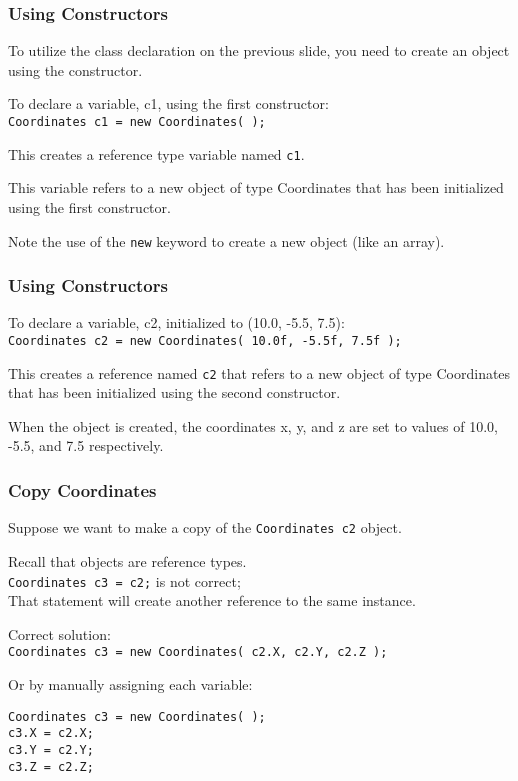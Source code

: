 \begin{frame}
\frametitle{Using Constructors}

To utilize the class declaration on the previous slide, you need to create an object using the constructor.

To declare a variable, c1, using the first constructor:\\
\quad \texttt{Coordinates c1 = new Coordinates( );}

This creates a reference type variable named \texttt{c1}.

This variable refers to a new object of type Coordinates that has been initialized using the first constructor.

Note the use of the \texttt{new} keyword to create a new object (like an array).

\end{frame}

\begin{frame}
\frametitle{Using Constructors}
To declare a variable, c2, initialized to (10.0, -5.5, 7.5):\\
\texttt{Coordinates c2 = new Coordinates( 10.0f, -5.5f, 7.5f );}

This creates a reference named \texttt{c2} that refers to a new object of type Coordinates that has been initialized using the second constructor.

When the object is created, the coordinates x, y, and z are set to values of 10.0, -5.5, and 7.5 respectively.

\end{frame}

\begin{frame}[fragile]
\frametitle{Copy Coordinates}
Suppose we want to make a copy of the \texttt{Coordinates c2} object.

Recall that objects are reference types. \\
\quad \texttt{Coordinates c3 = c2;} is not correct; \\
\quad That statement will create another reference to the same instance.

Correct solution:\\
\quad \texttt{Coordinates c3 = new Coordinates( c2.X, c2.Y, c2.Z );}


Or by manually assigning each variable:
\begin{verbatim}
Coordinates c3 = new Coordinates( );
c3.X = c2.X;
c3.Y = c2.Y;
c3.Z = c2.Z;
\end{verbatim}

\end{frame}

